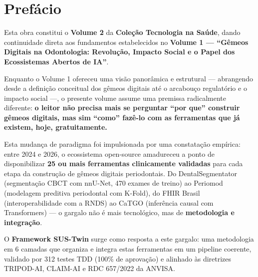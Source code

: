 \newpage
\chapter*{Prefácio}

\noindent Esta obra constitui o \textbf{Volume 2} da \textbf{Coleção Tecnologia na Saúde}, dando continuidade direta aos fundamentos estabelecidos no \textbf{Volume 1 --- ``Gêmeos Digitais na Odontologia: Revolução, Impacto Social e o Papel dos Ecossistemas Abertos de IA''}.

\vspace{0.5cm}

\noindent Enquanto o Volume 1 ofereceu uma visão panorâmica e estrutural --- abrangendo desde a definição conceitual dos gêmeos digitais até o arcabouço regulatório e o impacto social ---, o presente volume assume uma premissa radicalmente diferente: \textbf{o leitor não precisa mais se perguntar ``por que'' construir gêmeos digitais, mas sim ``como'' fazê-lo com as ferramentas que já existem, hoje, gratuitamente.}

\vspace{0.5cm}

\noindent Esta mudança de paradigma foi impulsionada por uma constatação empírica: entre 2024 e 2026, o ecossistema open-source amadureceu a ponto de disponibilizar \textbf{25 ou mais ferramentas clinicamente validadas} para cada etapa da construção de gêmeos digitais periodontais. Do DentalSegmentator (segmentação CBCT com nnU-Net, 470 exames de treino) ao Periomod (modelagem preditiva periodontal com K-Fold), do FHIR Brasil (interoperabilidade com a RNDS) ao CaTGO (inferência causal com Transformers) --- o gargalo não é mais tecnológico, mas de \textbf{metodologia e integração}.

\vspace{0.5cm}

\noindent O \textbf{Framework SUS-Twin} surge como resposta a este gargalo: uma metodologia em 6 camadas que organiza e integra estas ferramentas em um pipeline coerente, validado por 312 testes TDD (100\% de aprovação) e alinhado às diretrizes TRIPOD-AI, CLAIM-AI e RDC 657/2022 da ANVISA.

\vspace{0.5cm}

